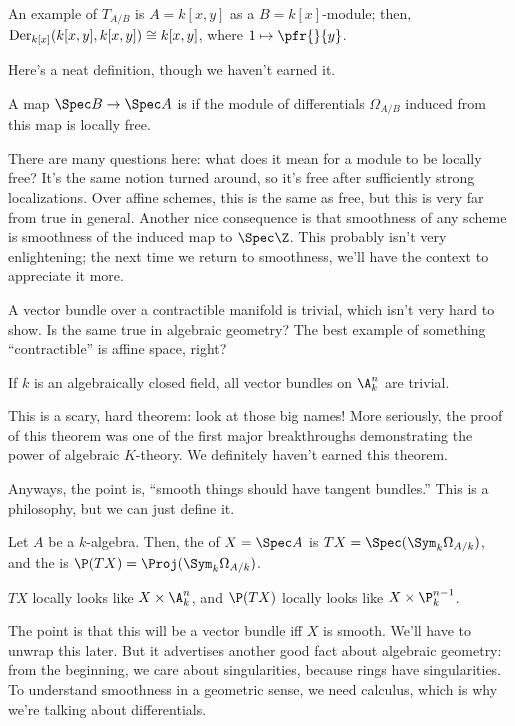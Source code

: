 An example of \(T_{A/B}\) is \(A = k[x,y]\) as a \(B = k[x]\)-module; then, \(\operatorname{Der}_{k[x]}(k[x,y],k[x,y]) \cong
k[x,y]\), where \(1\mapsto \pfr{}{y}\).

Here's a neat definition, though we haven't earned it.
\begin{defn}
A map \(\Spec B\to\Spec A\) is  if the module of differentials \(\Omega_{A/B}\) induced from this map
is locally free.
\end{defn}
There are many questions here: what does it mean for a module to be locally free? It's the same notion turned
around, so it's free after sufficiently strong localizations. Over affine schemes, this is the same as free, but
this is very far from true in general. Another nice consequence is that smoothness of any scheme is smoothness of
the induced map to \(\Spec\Z\). This probably isn't very enlightening; the next time we return to smoothness, we'll
have the context to appreciate it more.

A vector bundle over a contractible manifold is trivial, which isn't very hard to show. Is the same true in
algebraic geometry? The best example of something ``contractible'' is affine space, right?
\begin{thm}
If \(k\) is an algebraically closed field, all vector bundles on \(\A_k^n\) are trivial.
\end{thm}
This is a scary, hard theorem: look at those big names! More seriously, the proof of this theorem was one of the
first major breakthroughs demonstrating the power of algebraic \(K\)-theory. We definitely haven't earned this
theorem.

Anyways, the point is, ``smooth things should have tangent bundles.'' This is a philosophy, but we can just define
it.
\begin{defn}
Let \(A\) be a \(k\)-algebra. Then, the  of \(X = \Spec A\) is \(TX = \Spec(\Sym_k
\Omega_{A/k})\), and the  is \(\P(TX) = \Proj(\Sym_k\Omega_{A/k})\).
\end{defn}
\(TX\) locally looks like \(X\times\A_k^n\), and \(\P(TX)\) locally looks like \(X\times\P_k^{n-1}\).

The point is that this will be a vector bundle iff \(X\) is smooth. We'll have to unwrap this later. But it
advertises another good fact about algebraic geometry: from the beginning, we care about singularities, because
rings have singularities. To understand smoothness in a geometric sense, we need calculus, which is why we're
talking about differentials.

